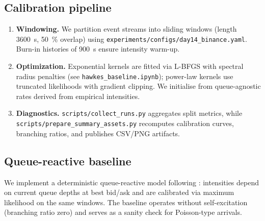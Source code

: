 \documentclass[11pt]{article}
\newcommand{\1}{\mathbbm{1}}
\begin{document}
\subsection{Calibration pipeline}
\begin{enumerate}[leftmargin=*, itemsep=2pt]
  \item \textbf{Windowing.} We partition event streams into sliding windows (length \SI{3600}{s}, \SI{50}{\percent} overlap) using \texttt{experiments/configs/day14\_binance.yaml}. Burn-in histories of \SI{900}{s} ensure intensity warm-up.
  \item \textbf{Optimization.} Exponential kernels are fitted via L-BFGS with spectral radius penalties (see \texttt{hawkes\_baseline.ipynb}); power-law kernels use truncated likelihoods with gradient clipping. We initialise from queue-agnostic rates derived from empirical intensities.
  \item \textbf{Diagnostics.} \texttt{scripts/collect\_runs.py} aggregates split metrics, while \texttt{scripts/prepare\_summary\_assets.py} recomputes calibration curves, branching ratios, and publishes CSV/PNG artifacts.
\end{enumerate}

\subsection{Queue-reactive baseline}
We implement a deterministic queue-reactive model following \cite{HuangLehalleRosenbaum2015}: intensities depend on current queue depths at best bid/ask and are calibrated via maximum likelihood on the same windows. The baseline operates without self-excitation (branching ratio zero) and serves as a sanity check for Poisson-type arrivals.
\end{document}
